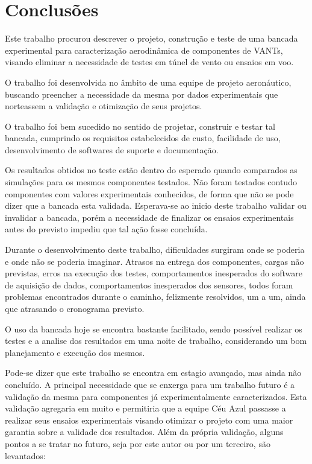 \chapter{Conclusões}\label{chp:conc}

    Este trabalho procurou descrever o projeto, construção e teste de uma bancada experimental para caracterização aerodinâmica de componentes de VANTs, visando eliminar a necessidade de testes em túnel de vento ou ensaios em voo.
    
    O trabalho foi desenvolvida no âmbito de uma equipe de projeto aeronáutico, buscando preencher a necessidade da mesma por dados experimentais que norteassem a validação e otimização de seus projetos.
    
    O trabalho foi bem sucedido no sentido de projetar, construir e testar tal bancada, cumprindo os requisitos estabelecidos de custo, facilidade de uso, desenvolvimento de softwares de suporte e documentação. 
    
    Os resultados obtidos no teste estão dentro do esperado quando comparados as simulações para os mesmos componentes testados.  Não foram testados contudo componentes com valores experimentais conhecidos, de forma que não se pode dizer que a bancada esta validada. Esperava-se ao inicio deste trabalho validar ou invalidar a bancada, porém a necessidade de finalizar os ensaios experimentais antes do previsto impediu que tal ação fosse concluída.
    
    Durante o desenvolvimento deste trabalho, dificuldades surgiram onde se poderia e onde não se poderia imaginar. Atrasos na entrega dos componentes, cargas não previstas, erros na execução dos testes, comportamentos inesperados do software de aquisição de dados, comportamentos inesperados dos sensores, todos foram problemas encontrados durante o caminho, felizmente resolvidos, um a um, ainda que atrasando o cronograma previsto.
    
    O uso da bancada hoje se encontra bastante facilitado, sendo possível realizar os testes e a analise dos resultados em uma noite de trabalho, considerando um bom planejamento e execução dos mesmos.
    
    Pode-se dizer que este trabalho se encontra em estagio avançado, mas ainda não concluído. A principal necessidade que se enxerga para um trabalho futuro é a validação da mesma para componentes já experimentalmente caracterizados. Esta validação agregaria em muito e permitiria que a equipe Céu Azul passasse a realizar seus ensaios experimentais visando otimizar o projeto com uma maior garantia sobre a validade dos resultados. Além da própria validação, alguns pontos a se tratar no futuro, seja por este autor ou por um terceiro, são levantados:
    
